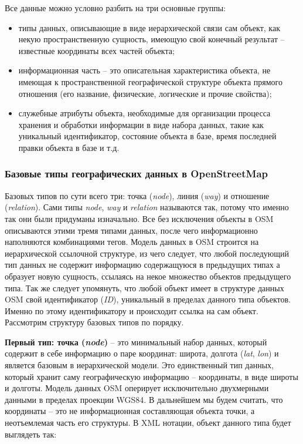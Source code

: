 Все данные можно условно разбить на три основные группы:
\begin{itemize}
    \item типы данных, описывающие в виде иерархической связи сам объект, как 
        некую пространственную сущность, имеющую свой конечный результат -- 
        известные координаты всех частей объекта;
    \item информационная часть -- это описательная характеристика объекта, не 
        имеющая к пространственной географической структуре объекта прямого 
        отношения (его название, физические, логические и прочие свойства);
    \item служебные атрибуты объекта, необходимые для организации процесса 
        хранения и обработки информации в виде набора данных, такие как 
        уникальный идентификатор, состояние объекта в базе, время последней 
        правки объекта в базе и т.д.
\end{itemize}

\subsubsection{Базовые типы географических данных в OpenStreetMap}
\label{part01}
Базовых типов по сути всего три: точка (\emph{node}), линия (\emph{way}) и 
отношение (\emph{relation}). Сами типы \emph{node}, \emph{way} и 
\emph{relation} называются так, потому что именно так они были придуманы 
изначально. Все без исключения объекты в OSM описываются этими тремя типами 
данных, после чего информационно наполняются комбинациями тегов. Модель данных 
в OSM строится на иерархической ссылочной структуре, из чего следует, что 
любой последующий тип данных не содержит информацию содержащуюся в предыдущих 
типах а образует новую сущность, ссылаясь на некое множество объектов 
предыдущего типа. Так же следует упомянуть, что любой объект имеет в структуре 
данных OSM свой идентификатор (\emph{ID}), уникальный в пределах данного типа 
объектов. Именно по этому идентификатору и происходит ссылка на сам объект. 
Рассмотрим структуру базовых типов по порядку.

\textbf{Первый тип: точка (\emph{node})} -- это минимальный набор данных, 
который содержит в себе информацию о паре координат: широта, долгота 
(\emph{lat}, \emph{lon}) и является базовым в иерархической модели. Это 
единственный тип данных, который хранит саму географическую информацию -- 
координаты, в виде широты и долготы. Модель данных OSM оперирует исключительно 
двухмерными данными в пределах проекции WGS84. В дальнейшем мы будем считать, 
что координаты -- это не информационная составляющая объекта точки, а 
неотъемлемая часть его структуры. В XML нотации, объект данного типа будет 
выглядеть так:

